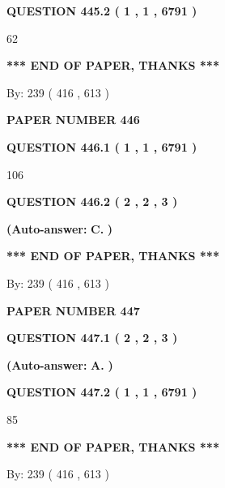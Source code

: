 \documentclass[12pt]{article}
\begin{document}
  
{\textbf{\large{QUESTION
445.2 
 ( 1 , 1 , 6791 )
}}}

62
   
   
   
   
\vspace{1.0in} 
{\textbf{\large{ *** END OF PAPER, THANKS *** }}} 
   
   
\hspace{1.0in} By: 
 239 ( 416 ,  613 )
   
   
   
   
\newpage 
\setcounter{page}{ 
   446001 } 
   
   
 {\textbf{ \Large{ PAPER NUMBER  446  }}}
   
   
   
   
  
  
{\textbf{\large{QUESTION
446.1 
 ( 1 , 1 , 6791 )
}}}

106
  
  
{\textbf{\large{QUESTION
446.2 
 ( 2 , 2 , 3 )
}}}
 
 
{\textbf{(Auto-answer:}}
{\textbf{\large{
C.}}}
{\textbf{)}}
 
 
   
   
   
   
\vspace{1.0in} 
{\textbf{\large{ *** END OF PAPER, THANKS *** }}} 
   
   
\hspace{1.0in} By: 
 239 ( 416 ,  613 )
   
   
   
   
\newpage 
\setcounter{page}{ 
   447001 } 
   
   
 {\textbf{ \Large{ PAPER NUMBER  447  }}}
   
   
   
   
  
  
{\textbf{\large{QUESTION
447.1 
 ( 2 , 2 , 3 )
}}}
 
 
{\textbf{(Auto-answer:}}
{\textbf{\large{
A.}}}
{\textbf{)}}
 
 
  
  
{\textbf{\large{QUESTION
447.2 
 ( 1 , 1 , 6791 )
}}}

85
   
   
   
   
\vspace{1.0in} 
{\textbf{\large{ *** END OF PAPER, THANKS *** }}} 
   
   
\hspace{1.0in} By: 
 239 ( 416 ,  613 )
   
   
   
\end{document}
